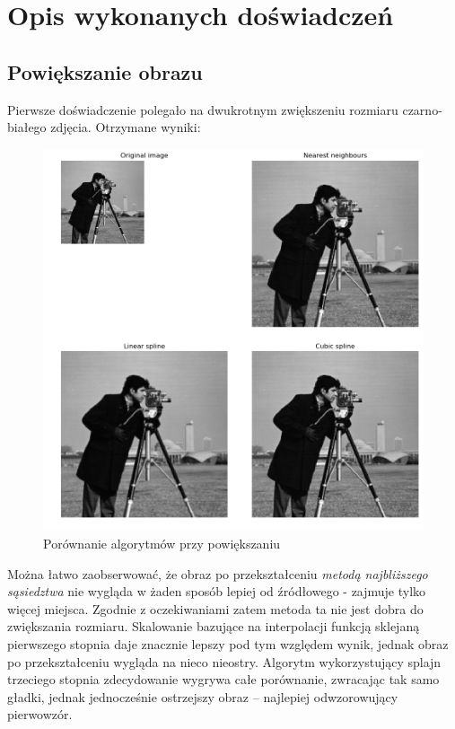 \documentclass{article}
\begin{document}
\newpage
\section{Opis wykonanych doświadczeń}

\subsection{Powiększanie obrazu}

Pierwsze doświadczenie polegało na dwukrotnym zwiększeniu rozmiaru czarno-białego zdjęcia. Otrzymane wyniki:

\begin{figure}[ht]
    \centering
    \includegraphics[width=\textwidth]{images/cameraman-com.png}
    \caption{Porównanie algorytmów przy powiększaniu}
    \label{fig:cameraman-com}
\end{figure}

Można łatwo zaobserwować, że obraz po przekształceniu \textit{metodą najbliższego sąsiedztwa} nie wygląda w żaden sposób lepiej od źródłowego - zajmuje tylko więcej miejsca. Zgodnie z oczekiwaniami zatem metoda ta nie jest dobra do zwiększania rozmiaru. Skalowanie bazujące na interpolacji funkcją sklejaną pierwszego stopnia daje znacznie lepszy pod tym względem wynik, jednak obraz po przekształceniu wygląda na nieco nieostry. Algorytm wykorzystujący splajn trzeciego stopnia zdecydowanie wygrywa całe porównanie, zwracając tak samo gładki, jednak jednocześnie ostrzejszy obraz -- najlepiej odwzorowujący pierwowzór.
\end{document}
